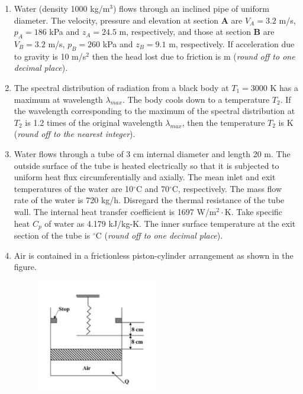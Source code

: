 \documentclass[12pt,onecolumn]{article}
\begin{document}
\begin{enumerate}
    \item Water (density 1000 kg/m$^3$) flows through an inclined pipe of uniform diameter. The velocity, pressure and elevation at section $\mathbf{A}$ are $V_A = 3.2$ m/s, $p_A = 186$ kPa and $z_A = 24.5$ m, respectively, and those at section $\mathbf{B}$ are $V_B = 3.2$ m/s, $p_B = 260$ kPa and $z_B = 9.1$ m, respectively. If acceleration due to gravity is 10 m/s$^2$ then the head lost due to friction is \underline{\hspace{2cm}} m (\textit{round off to one decimal place}).

    \item The spectral distribution of radiation from a black body at $T_1 = 3000$ K has a maximum at wavelength $\lambda_{max}$. The body cools down to a temperature $T_2$. If the wavelength corresponding to the maximum of the spectral distribution at $T_2$ is 1.2 times of the original wavelength $\lambda_{max}$, then the temperature $T_2$ is \underline{\hspace{2cm}} K (\textit{round off to the nearest integer}).

    \item Water flows through a tube of 3 cm internal diameter and length 20 m. The outside surface of the tube is heated electrically so that it is subjected to uniform heat flux circumferentially and axially. The mean inlet and exit temperatures of the water are 10$^\circ$C and 70$^\circ$C, respectively. The mass flow rate of the water is 720 kg/h. Disregard the thermal resistance of the tube wall. The internal heat transfer coefficient is 1697 W/m$^2\cdot$K. Take specific heat $C_p$ of water as 4.179 kJ/kg-K. The inner surface temperature at the exit section of the tube is \underline{\hspace{2cm}} $^\circ$C (\textit{round off to one decimal place}).

    \item Air is contained in a frictionless piston-cylinder arrangement as shown in the figure.

          \begin{figure}[H]
              \centering
              \includegraphics[width=0.5\textwidth]{q52s2}
              \label{fig:q52s2}
          \end{figure}


\end{enumerate}
\end{document}
